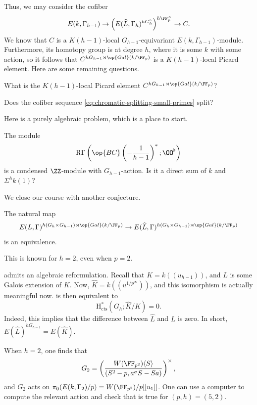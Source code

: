 \documentclass[../notes.tex]{subfiles}
\begin{document}
Thus, we may consider the cofiber
\begin{equation}
	E(k,\Gamma_{h-1})\to\left(E(\widehat L,\Gamma_h)^{hG_h^\circ}\right)^{h\FF_p^\times}\to C. \label{eq:chromatic-splitting-small-primes}
\end{equation}
We know that $C$ is a $K(h-1)$-local $G_{h-1}$-equivariant $E(k,\Gamma_{h-1})$-module. Furthermore, its homotopy group is at degree $h$, where it is some $k$ with some action, so it follows that $C^{hG_{h-1}\rtimes\op{Gal}(k/\FF_p)}$ is a $K(h-1)$-local Picard element. Here are some remaining questions.
\begin{ques}
	What is the $K(h-1)$-local Picard element $C^{hG_{h-1}\rtimes\op{Gal}(k/\FF_p)}$?
\end{ques}
\begin{ques}
	Does the cofiber sequence \eqref{eq:chromatic-splitting-small-primes} split?
\end{ques}
Here is a purely algebraic problem, which is a place to start.
\begin{ques}
	The module
	\[\mathrm R\Gamma\left(\op{BC}\left(-\frac1{h-1}\right)^*;\OO^\flat\right)\]
	is a condensed $\ZZ$-module with $G_{h-1}$-action. Is it a direct sum of $k$ and $\Sigma^hk(1)$?
\end{ques}
We close our course with another conjecture.
\begin{conj}[Deperfection] \label{conj:deperfection}
	The natural map
	\[E(L,\Gamma)^{h(G_h\times G_{h-1})\rtimes\op{Gal}(k/\FF_p)}\to E(\widehat L,\Gamma)^{h(G_h\times G_{h-1})\rtimes\op{Gal}(k/\FF_p)}\]
	is an equivalence.
\end{conj}
\begin{remark}
	This is known for $h=2$, even when $p=2$.
\end{remark}
\begin{remark}
	 admits an algebraic reformulation. Recall that $K=k((u_{h-1}))$, and $L$ is some Galois extension of $K$. Now, $\widehat K=k((u^{1/p^\infty}))$, and this isomorphism is actually meaningful now.  is then equivalent to
	\[\mathrm H^*_{\mathrm{cts}}\left(G_h;\widehat K/K\right)=0.\]
	Indeed, this implies that the difference between $\widehat L$ and $L$ is zero. In short, $E(\widehat L)^{hG_{h-1}}=E(\widehat K)$.
\end{remark}
\begin{example}
	When $h=2$, one finds that
	\[G_2=\left(\frac{W(\FF_{p^2})\langle S\rangle}{\left(S^2-p,a^\sigma S-Sa\right)}\right)^\times,\]
	and $G_2$ acts on $\pi_0(E(k,\Gamma_2)/p)=W(\FF_{p^2})/p[[u_1]]$. One can use a computer to compute the relevant action and check that  is true for $(p,h)=(5,2)$.
\end{example}
\end{document}
